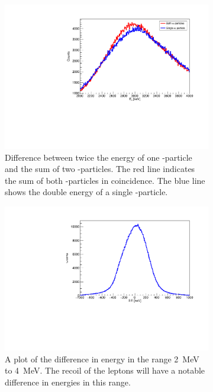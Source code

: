 \begin{figure}[h]
	\begin{subfigure}[t]{.48\linewidth}
		
		\includegraphics[width=\textwidth]{../figures/recoil.pdf}
		\caption{Difference between twice the energy of one \al-particle and the sum of two \al-particles. The red line indicates the sum of both \al-particles in coincidence. The blue line shows the double energy of a single \al-particle.}
		\label{fig:recoil}
	\end{subfigure}\hfill
	\begin{subfigure}[t]{.48\textwidth}
		
		\includegraphics[width=\linewidth]{../figures/recoilGauss.pdf}
		\caption{A plot of the difference in energy in the range \SI{2}{MeV} to \SI{4}{MeV}. The recoil of the leptons will have a notable difference in energies in this range.}
		\label{fig:recoilGauss}
	\end{subfigure}
	\caption{}
\end{figure}

